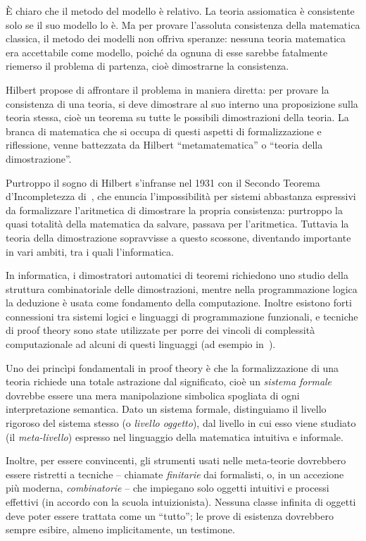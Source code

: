 \documentclass[12pt,a4paper,openright,twoside]{report}
\begin{document}
\`E chiaro che il metodo del modello \`e relativo. La teoria assiomatica \`e consistente solo se il suo modello lo \`e. Ma per provare l'assoluta consistenza della matematica classica, il metodo dei modelli non offriva speranze: nessuna teoria matematica era accettabile come modello, poich\'e da ognuna di esse sarebbe fatalmente riemerso il problema di partenza, cio\`e dimostrarne la consistenza.

Hilbert propose di affrontare il problema in maniera diretta: per provare la consistenza di una teoria, si deve dimostrare al suo interno una proposizione sulla teoria stessa, cio\`e un teorema su tutte le possibili dimostrazioni della teoria. La branca di matematica che si occupa di questi aspetti di formalizzazione e riflessione, venne battezzata da Hilbert ``metamatematica'' o ``teoria della dimostrazione''.

Purtroppo il sogno di Hilbert s'infranse nel 1931 con il Secondo Teorema d'Incompletezza di~\cite{God31}, che enuncia l'impossibilit\`a per sistemi abbastanza espressivi da formalizzare l'aritmetica di dimostrare la propria consistenza: purtroppo la quasi totalit\`a della matematica da salvare, passava per l'aritmetica. Tuttavia la teoria della dimostrazione sopravvisse a questo scossone, diventando importante in vari ambiti, tra i quali l'informatica.

In informatica, i dimostratori automatici di teoremi richiedono uno studio della struttura combinatoriale delle dimostrazioni, mentre nella programmazione logica la deduzione \`e usata come fondamento della computazione. Inoltre esistono forti connessioni tra sistemi logici e linguaggi di programmazione funzionali, e tecniche di proof theory sono state utilizzate per porre dei vincoli di complessit\`a computazionale ad alcuni di questi linguaggi (ad esempio in~\cite{Gir95a}).


Uno dei princ\`ipi fondamentali in proof theory \`e che la formalizzazione di una teoria richiede una totale astrazione dal significato, cio\`e un \emph{sistema formale} dovrebbe essere una mera manipolazione simbolica spogliata di ogni interpretazione semantica. Dato un sistema formale, distinguiamo il livello rigoroso del sistema stesso (o \emph{livello oggetto}), dal livello in cui esso viene studiato (il \emph{meta-livello}) espresso nel linguaggio della matematica intuitiva e informale. 

Inoltre, per essere convincenti, gli strumenti usati nelle meta-teorie dovrebbero essere ristretti a tecniche -- chiamate \emph{finitarie} dai formalisti, o, in un accezione pi\`u moderna, \emph{combinatorie} -- che impiegano solo oggetti intuitivi e processi effettivi (in accordo con la scuola intuizionista). Nessuna classe infinita di oggetti deve poter essere trattata come un ``tutto''; le prove di esistenza dovrebbero sempre esibire, almeno implicitamente, un testimone.
\end{document}
